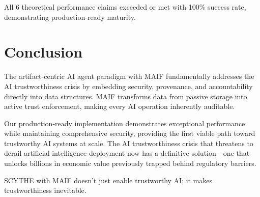 \documentclass[conference]{IEEEtran}
\begin{document}
All 6 theoretical performance claims exceeded or met with 100\% success rate, demonstrating production-ready maturity.

\section{Conclusion}

The artifact-centric AI agent paradigm with MAIF fundamentally addresses the AI trustworthiness crisis by embedding security, provenance, and accountability directly into data structures. MAIF transforms data from passive storage into active trust enforcement, making every AI operation inherently auditable.

Our production-ready implementation demonstrates exceptional performance while maintaining comprehensive security, providing the first viable path toward trustworthy AI systems at scale. The AI trustworthiness crisis that threatens to derail artificial intelligence deployment now has a definitive solution—one that unlocks billions in economic value previously trapped behind regulatory barriers.

SCYTHE with MAIF doesn't just enable trustworthy AI; it makes trustworthiness inevitable.


\end{document}
